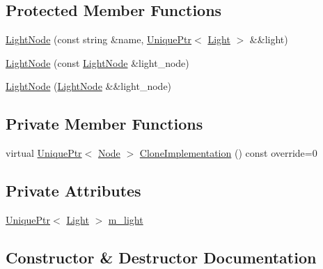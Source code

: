 \subsection*{Protected Member Functions}
\begin{DoxyCompactItemize}
\item 
\hyperlink{classmage_1_1_light_node_a4fea7bde70aebb6f9dc30e3374507c8a}{Light\+Node} (const string \&name, \hyperlink{namespacemage_a8c307fbcc33bce9b7f2aa4c26c3b95cf}{Unique\+Ptr}$<$ \hyperlink{classmage_1_1_light}{Light} $>$ \&\&light)
\item 
\hyperlink{classmage_1_1_light_node_afc1174329e2dbf2d349303fc396c3760}{Light\+Node} (const \hyperlink{classmage_1_1_light_node}{Light\+Node} \&light\+\_\+node)
\item 
\hyperlink{classmage_1_1_light_node_a0a2d5ee9e6417d73905d6f35116eccb3}{Light\+Node} (\hyperlink{classmage_1_1_light_node}{Light\+Node} \&\&light\+\_\+node)
\end{DoxyCompactItemize}
\subsection*{Private Member Functions}
\begin{DoxyCompactItemize}
\item 
virtual \hyperlink{namespacemage_a8c307fbcc33bce9b7f2aa4c26c3b95cf}{Unique\+Ptr}$<$ \hyperlink{classmage_1_1_node}{Node} $>$ \hyperlink{classmage_1_1_light_node_aea97601d0a4b8073a1c655ca334af242}{Clone\+Implementation} () const override=0
\end{DoxyCompactItemize}
\subsection*{Private Attributes}
\begin{DoxyCompactItemize}
\item 
\hyperlink{namespacemage_a8c307fbcc33bce9b7f2aa4c26c3b95cf}{Unique\+Ptr}$<$ \hyperlink{classmage_1_1_light}{Light} $>$ \hyperlink{classmage_1_1_light_node_aad97d01d2adb66eac0e93bdcdb919a05}{m\+\_\+light}
\end{DoxyCompactItemize}


\subsection{Constructor \& Destructor Documentation}
\hypertarget{classmage_1_1_light_node_ad0c650ac0059589c28a3d1cfec95c07d}{}\label{classmage_1_1_light_node_ad0c650ac0059589c28a3d1cfec95c07d} 
